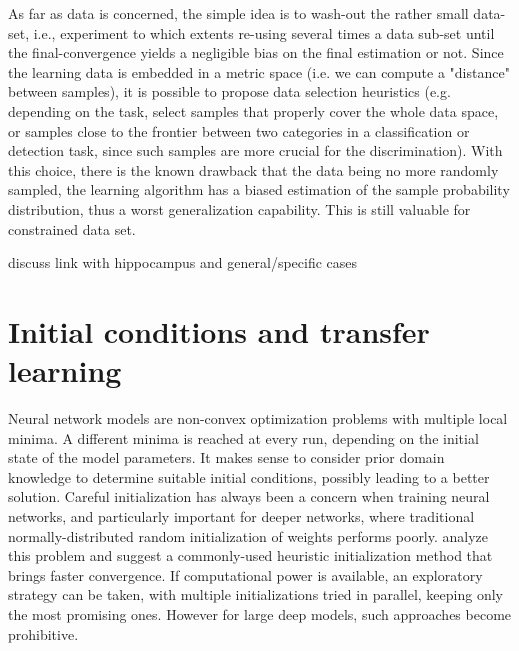 \documentclass[twocolumn]{article}
\begin{document}
\begin{outline}
\1 As far as data is concerned, the simple idea is to wash-out the rather small data-set, i.e., experiment to which extents re-using several times a data sub-set until the final-convergence yields a negligible bias on the final estimation or not. Since the learning data is embedded in a metric space (i.e. we can compute a "distance" between samples), it is possible to propose data selection heuristics (e.g. depending on the task, select samples that properly cover the whole data space, or samples close to the frontier between two categories in a classification or detection task, since such samples are more crucial for the discrimination). With this choice, there is the known drawback that the data being no more randomly sampled, the learning algorithm has a biased estimation of the sample probability distribution, thus a worst generalization capability. This is still valuable for constrained data set.

\1 discuss link with hippocampus and general/specific cases
\end{outline}



\section{Initial conditions and transfer learning}

Neural network models are non-convex optimization problems with multiple local minima. A different minima is reached at every run, depending on the initial state of the model parameters. It makes sense to consider prior domain knowledge to determine suitable initial conditions, possibly leading to a better solution. 
Careful initialization has always been a concern when training neural networks, and particularly important for deeper networks, where traditional normally-distributed random initialization of weights performs poorly. \cite{Glorot2010Understanding} analyze this problem and suggest a commonly-used heuristic initialization method that brings faster convergence.
If computational power is available, an exploratory strategy can be taken, with multiple initializations tried in parallel, keeping only the most promising ones. However for large deep models, such approaches become prohibitive.
\end{document}
